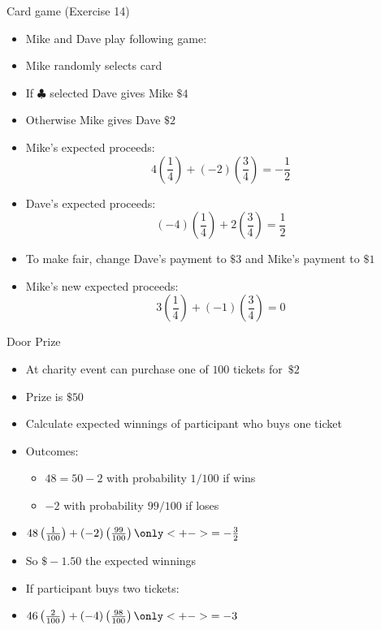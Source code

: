 \documentclass[handout]{beamer}
\theoremstyle{definition}
\begin{document}
\begin{frame}{Card game (Exercise 14)}
\begin{itemize}
\item Mike and Dave play following game:
\item Mike randomly selects card
\item If $\clubsuit$ selected Dave gives Mike $\$4$
\item Otherwise Mike gives Dave $\$2$
\item Mike's expected proceeds:
\[4\left(\frac{1}{4}\right)+\left(-2\right)\left(\frac{3}{4}\right)
=-\frac{1}{2}\]
\item Dave's expected proceeds:
\[\left(-4\right)\left(\frac{1}{4}\right)
+2\left(\frac{3}{4}\right)
=\frac{1}{2}\]
\item To make fair, change Dave's payment to $\$3$
and Mike's payment to $\$1$
\item Mike's new expected proceeds:
\[3\left(\frac{1}{4}\right)+\left(-1\right)\left(\frac{3}{4}\right)=0\]
\end{itemize}
\end{frame}

\begin{frame}{Door Prize}
\begin{itemize}
\item At charity event can purchase one of $100$ tickets for~$\$2$
\item Prize is $\$50$
\item Calculate expected winnings of participant who buys one ticket
\item Outcomes:
\begin{itemize}
\item $48=50-2$ with probability $1/100$ if wins
\item $-2$ with probability $99/100$ if loses
\end{itemize} 
\item $48\left(\frac{1}{100}\right)+\left(-2\right)
\left(\frac{99}{100}\right)
\only<+->{=-\frac{3}{2}}$
\item So $\$-1.50$ the expected winnings
\item If participant buys \alert{two} tickets:
\item $46\left(\frac{2}{100}\right)+\left(-4\right)
\left(\frac{98}{100}\right)
\only<+->{=-3}$
\end{itemize}
\end{frame}
\end{document}
